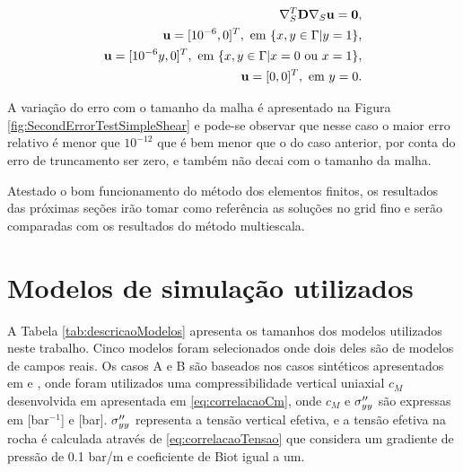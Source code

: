 \begin{equation}\label{eq:simpleshear}
    \begin{aligned}
       \nabla_S^T \mathbf{D} \nabla_S  \mathbf{u} = \mathbf{0} , \\
        \mathbf{u} = [10^{-6}, 0]^T, \text{ em } \{x, y \in \Gamma | y = 1\} ,\\
        \mathbf{u} = [10^{-6}y, 0]^T, \text{ em } \{x, y \in \Gamma | x = 0 \text{ ou } x = 1\}, \\
        \mathbf{u} = [0, 0]^T, \text{ em } y=0.
    \end{aligned}
\end{equation}

A variação do erro com o tamanho da malha é apresentado na Figura \ref{fig:SecondErrorTestSimpleShear} e pode-se observar que nesse caso o maior erro relativo é menor que $10^{-12}$ que é bem menor que o do caso anterior, por conta do erro de truncamento ser zero, e também não decai com o tamanho da malha.

Atestado o bom funcionamento do método dos elementos finitos, os resultados das próximas seções irão tomar como referência as soluções no grid fino e serão comparadas com os resultados do método multiescala.


\section{Modelos de simulação utilizados}

 A Tabela \ref{tab:descricaoModelos} apresenta os tamanhos dos modelos utilizados neste trabalho. Cinco modelos foram selecionados onde dois deles são de modelos de campos reais. Os casos A e B são baseados nos casos sintéticos apresentados em \cite{casteletto} e \cite{irina}, onde foram utilizados uma compressibilidade vertical uniaxial $c_M$ desenvolvida em \citet{correlacaoE} apresentada em \eqref{eq:correlacaoCm}, onde $c_M$ e $\sigma^{\prime\prime}_{yy}$ são expressas em [bar$^{-1}$] e [bar]. $\sigma^{\prime\prime}_{yy}$ representa a tensão vertical efetiva, e a tensão efetiva na rocha é calculada através de  \eqref{eq:correlacaoTensao} que considera um gradiente de pressão de 0.1 bar/m e coeficiente de Biot igual a um.

